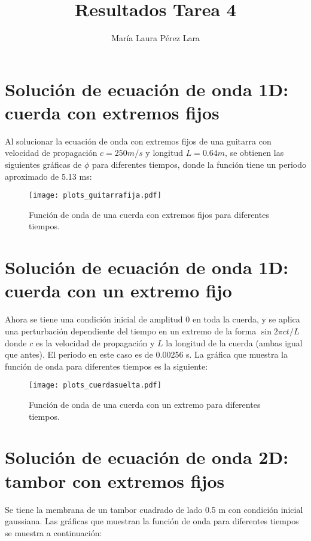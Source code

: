 \documentclass[a4paper,10pt]{article}
\begin{document}
\title{Resultados Tarea 4}

\author{María Laura Pérez Lara}

\maketitle
\section{Solución de ecuación de onda 1D: cuerda con extremos fijos}

Al solucionar la ecuación de onda con extremos fijos de una guitarra con velocidad de propagación $c=250 m/s$ y longitud $L=0.64m$, se obtienen las siguientes gráficas de $\phi$ para diferentes tiempos, donde la función tiene un periodo aproximado de 5.13 ms:

\begin{figure}[H]
    \centering
    \texttt{[image: plots\_guitarrafija.pdf]}
    \caption{Función de onda de una cuerda con extremos fijos para diferentes tiempos.}
\end{figure}

\section{Solución de ecuación de onda 1D: cuerda con un extremo fijo}

Ahora se tiene una condición inicial de amplitud 0 en toda la cuerda, y se aplica una perturbación dependiente del tiempo en un extremo de la forma $\sin{2\pi ct/L}$ donde $c$ es la velocidad de propagación y $L$ la longitud de la cuerda (ambas igual que antes). El periodo en este caso es de 0.00256 s. La gráfica que muestra la función de onda para diferentes tiempos es la siguiente:

\begin{figure}[H]
    \centering
    \texttt{[image: plots\_cuerdasuelta.pdf]}
    \caption{Función de onda de una cuerda con un extremo para diferentes tiempos.}
\end{figure}

\section{Solución de ecuación de onda 2D: tambor con extremos fijos}

Se tiene la membrana de un tambor cuadrado de lado 0.5 m con condición inicial gaussiana. Las gráficas que muestran la función de onda para diferentes tiempos se muestra a continuación:
\end{document}
